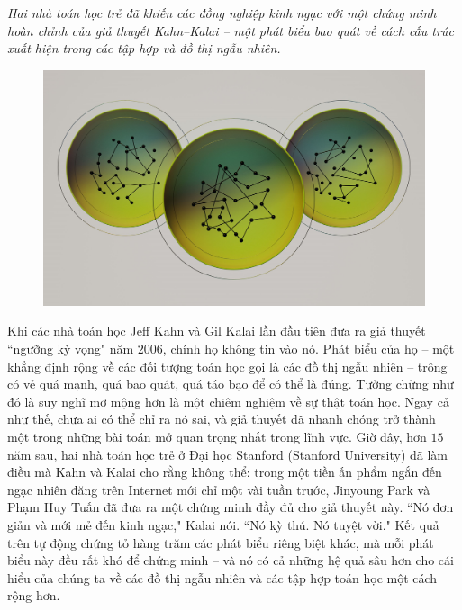 \begin{multicols}{2}	
	\textit{Hai nhà toán học trẻ đã khiến các đồng nghiệp kinh ngạc với một chứng minh hoàn chỉnh của giả thuyết Kahn--Kalai -- một phát biểu bao quát về cách cấu trúc xuất hiện trong các tập hợp và đồ thị ngẫu nhiên.}
	\begin{figure}[H]
		\vspace*{-5pt}
		\centering
		\captionsetup{labelformat= empty, justification=centering}
		\includegraphics[width= 1\linewidth]{1}
		\vspace*{-10pt}
	\end{figure}
	Khi các nhà toán học Jeff Kahn và Gil Kalai lần đầu tiên đưa ra giả thuyết ``ngưỡng kỳ vọng" năm $2006$, chính họ không tin vào nó. Phát biểu của họ -- một khẳng định rộng về các đối tượng toán học gọi là các đồ thị ngẫu nhiên -- trông có vẻ quá mạnh, quá bao quát, quá táo bạo để có thể là đúng. Tưởng chừng như đó là suy nghĩ mơ mộng hơn là một chiêm nghiệm về sự thật toán học. Ngay cả như thế, chưa ai có thể chỉ ra nó sai, và giả thuyết đã nhanh chóng trở thành một trong những bài toán mở quan trọng nhất trong lĩnh vực.
	\vskip 0.1cm
	Giờ đây, hơn $15$ năm sau, hai nhà toán học trẻ ở Đại học Stanford (Stanford University) đã làm điều mà Kahn và Kalai cho rằng không thể: trong một tiền ấn phẩm ngắn đến ngạc nhiên đăng trên Internet mới chỉ một vài tuần trước, Jinyoung Park và Phạm Huy Tuấn đã đưa ra một chứng minh đầy đủ cho giả thuyết này.
	\vskip 0.1cm
	``Nó đơn giản và mới mẻ đến  kinh ngạc," Kalai nói. ``Nó kỳ thú. Nó tuyệt vời."
	\vskip 0.1cm
	Kết quả trên tự động chứng tỏ hàng trăm các phát biểu riêng biệt khác, mà mỗi phát biểu này đều rất khó để chứng minh -- và nó có cả những hệ quả sâu hơn cho cái hiểu của chúng ta về các đồ thị ngẫu nhiên và các tập hợp toán học một cách rộng hơn.

\end{multicols}
